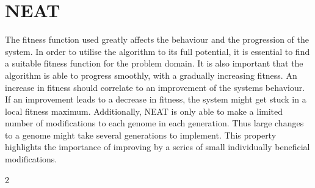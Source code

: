 \section{NEAT}
\label{conclusion_neat}
The fitness function used greatly affects the behaviour and the progression of the system. In order to utilise the algorithm to its full potential, it is essential to find a suitable fitness function for the problem domain. It is also important that the algorithm is able to progress smoothly, with a gradually increasing fitness. An increase in fitness should correlate to an improvement of the systems behaviour. If an improvement leads to a decrease in fitness, the system might get stuck in a local fitness maximum. Additionally, NEAT is only able to make a limited number of modifications to each genome in each generation. Thus large changes to a genome might take several generations to implement. This property highlights the importance of improving by a series of small individually beneficial modifications. 

2%




